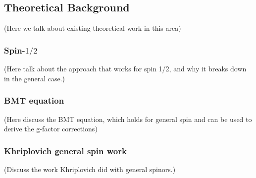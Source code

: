 
\subsection{Theoretical Background}

(Here we talk about existing theoretical work in this area)
\subsubsection{Spin-$1/2$}

(Here talk about the approach that works for spin 1/2, and why it breaks down in the general case.)

\subsubsection{BMT equation}

(Here discuss the BMT equation, which holds for general spin and can be used to derive the g-factor corrections)

\subsubsection{Khriplovich general spin work}
(Discuss the work Khriplovich did with general spinors.)
